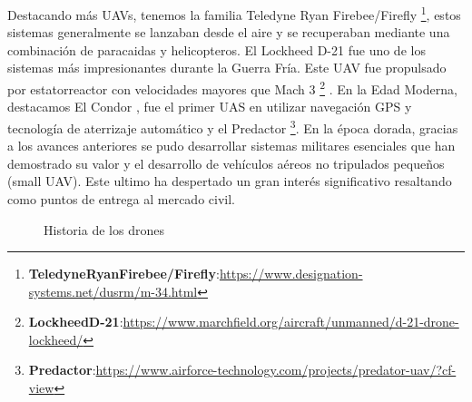Destacando más UAVs, tenemos la familia Teledyne Ryan Firebee/Firefly \footnote{\textbf{TeledyneRyanFirebee/Firefly}:\url{https://www.designation-systems.net/dusrm/m-34.html}}, estos sistemas generalmente se lanzaban desde el aire y se recuperaban mediante una combinación de paracaidas y helicopteros. El Lockheed D-21 fue uno de los sistemas más impresionantes durante la Guerra Fría. Este UAV fue propulsado por estatorreactor con velocidades mayores que Mach 3 \footnote{\textbf{LockheedD-21}:\url{https://www.marchfield.org/aircraft/unmanned/d-21-drone-lockheed/}} . En la Edad Moderna, destacamos El Condor \cite{CondorUAV}, fue el primer UAS en utilizar navegación GPS y tecnología de aterrizaje automático y el Predactor \footnote{\textbf{Predactor}:\url{https://www.airforce-technology.com/projects/predator-uav/?cf-view}}. 
En la época dorada, gracias a los avances anteriores se pudo desarrollar sistemas militares esenciales que han demostrado su valor y el desarrollo de vehículos aéreos no tripulados pequeños (small UAV). Este ultimo ha despertado un gran interés significativo resaltando como puntos de entrega al mercado civil. 

\begin{figure}[H]
  \begin{center}
  \caption{Historia de los drones}
  \label{f:Drones}
  \end{center}
 \end{figure}

